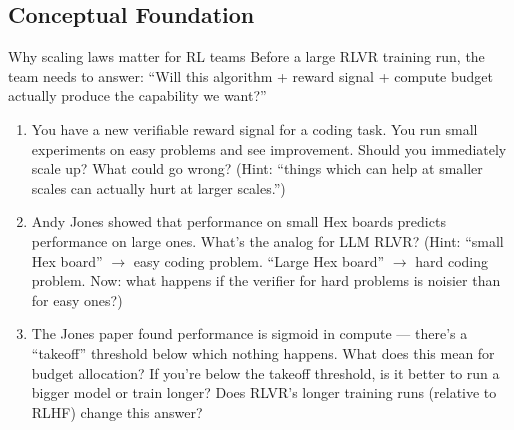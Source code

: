 \subsection{Conceptual Foundation}

\begin{thinkfirst}{Why scaling laws matter for RL teams}
Before a large RLVR training run, the team needs to answer: ``Will this algorithm + reward signal + compute budget actually produce the capability we want?''

\begin{enumerate}
  \item You have a new verifiable reward signal for a coding task. You run small experiments on easy problems and see improvement. Should you immediately scale up? What could go wrong? (Hint: ``things which can help at smaller scales can actually hurt at larger scales.'')

  \item Andy Jones showed that performance on small Hex boards predicts performance on large ones. What's the analog for LLM RLVR? (Hint: ``small Hex board'' $\to$ easy coding problem. ``Large Hex board'' $\to$ hard coding problem. Now: what happens if the verifier for hard problems is noisier than for easy ones?)

  \item The Jones paper found performance is sigmoid in compute --- there's a ``takeoff'' threshold below which nothing happens. What does this mean for budget allocation? If you're below the takeoff threshold, is it better to run a bigger model or train longer? Does RLVR's longer training runs (relative to RLHF) change this answer?
\end{enumerate}
\end{thinkfirst}


